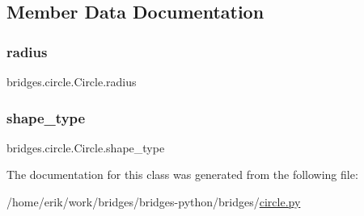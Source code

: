 \subsection{Member Data Documentation}
\mbox{\label{classbridges_1_1circle_1_1_circle_ab52ae32c28ea4175b815a7b04491205b}} 
\subsubsection{\texorpdfstring{radius}{radius}}
{\footnotesize\ttfamily bridges.\+circle.\+Circle.\+radius}

\mbox{\label{classbridges_1_1circle_1_1_circle_a34d318970485d12445ce43225b81428e}} 
\subsubsection{\texorpdfstring{shape\+\_\+type}{shape\_type}}
{\footnotesize\ttfamily bridges.\+circle.\+Circle.\+shape\+\_\+type}



The documentation for this class was generated from the following file\+:\begin{DoxyCompactItemize}
\item 
/home/erik/work/bridges/bridges-\/python/bridges/\hyperlink{circle_8py}{circle.\+py}\end{DoxyCompactItemize}
